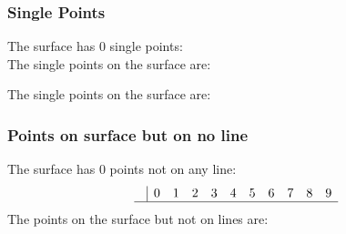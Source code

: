 \documentclass{article}
\begin{document}
{\subsubsection*{Single Points}
The surface has 0 single points:\\
The single points on the surface are:\\
\begin{multicols}{2}
\noindent
\end{multicols}
The single points on the surface are:\\
\subsubsection*{Points on surface but on no line}
The surface has 0 points not on any line:\\
$$
\begin{array}{r|*{10}{r}}
 & 0 & 1 & 2 & 3 & 4 & 5 & 6 & 7 & 8 & 9\\
\hline
\end{array}
$$
The points on the surface but not on lines are:\\
\begin{multicols}{2}
\noindent
\end{multicols}
}
\end{document}
